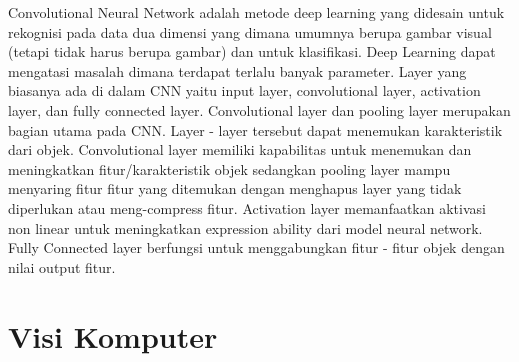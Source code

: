 Convolutional Neural Network adalah metode deep learning yang didesain untuk rekognisi pada data dua dimensi yang dimana umumnya berupa gambar visual (tetapi tidak harus berupa gambar) dan untuk klasifikasi. Deep Learning dapat mengatasi masalah dimana terdapat terlalu banyak parameter.  Layer yang biasanya ada di dalam CNN yaitu input layer, convolutional layer, activation layer, dan fully connected layer.
Convolutional layer dan pooling layer merupakan bagian utama pada CNN. Layer - layer tersebut dapat menemukan karakteristik dari objek. Convolutional layer memiliki kapabilitas untuk menemukan dan meningkatkan fitur/karakteristik objek sedangkan pooling layer mampu menyaring fitur fitur yang ditemukan dengan menghapus layer yang tidak diperlukan atau meng-compress fitur. Activation layer memanfaatkan aktivasi non linear untuk meningkatkan expression ability dari model neural network. Fully Connected layer berfungsi untuk menggabungkan fitur - fitur objek dengan nilai output fitur. \cite{Goodfellow-et-al-2016}







\section{Visi Komputer}
\label{sec:visikomputer}

